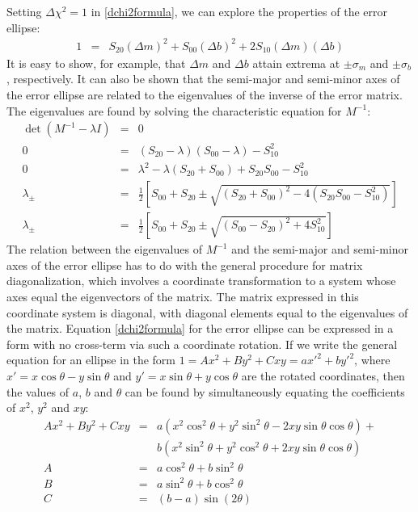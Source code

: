 \documentclass{article}
\begin{document}
Setting $\Delta \chi^2 = 1$ in \eqref{dchi2formula}, we can explore the properties of the error ellipse:
\begin{eqnarray}
  1 &=& S_{20} (\Delta m)^2 + S_{00} (\Delta b)^2 + 2S_{10} (\Delta m)(\Delta b) \label{errorellipse_1sig}
\end{eqnarray}
It is easy to show, for example, that $\Delta m$ and $\Delta b$ attain extrema at $\pm \sigma_m$ and $\pm \sigma_b$, respectively. It can also be shown that the semi-major and semi-minor axes of the error ellipse are related to the eigenvalues of the inverse of the error matrix. The eigenvalues are found by solving the characteristic equation for $M^{-1}$:
\begin{eqnarray}
  \det(M^{-1} - \lambda I) &=& 0 \\
  0 &=& (S_{20}-\lambda)(S_{00}-\lambda) - S_{10}^2 \\
  0 &=& \lambda^2 - \lambda(S_{20}+S_{00}) + S_{20}S_{00} - S_{10}^2 \\
  \lambda_{\pm} &=& \frac{1}{2}\left[S_{00}+S_{20} \pm \sqrt{(S_{20}+S_{00})^2-4(S_{20}S_{00}-S_{10}^2)}\right] \\
  \lambda_{\pm} &=& \frac{1}{2}\left[S_{00}+S_{20} \pm \sqrt{(S_{00}-S_{20})^2 + 4 S_{10}^2}\right]
\end{eqnarray}
The relation between the eigenvalues of $M^{-1}$ and the semi-major and semi-minor axes of the error ellipse has to do with the general procedure for matrix diagonalization, which involves a coordinate transformation to a system whose axes equal the eigenvectors of the matrix. The matrix expressed in this coordinate system is diagonal, with diagonal elements equal to the eigenvalues of the matrix. Equation \eqref{dchi2formula} for the error ellipse can be expressed in a form with no cross-term via such a coordinate rotation. If we write the general equation for an ellipse in the form $1 = A x^2 + B y^2 + Cxy = a {x'}^2 + b{y'^2}$, where $x' = x \cos \theta - y \sin \theta$ and $y' = x \sin \theta + y \cos \theta$ are the rotated coordinates, then the values of $a$, $b$ and $\theta$ can be found by simultaneously equating the coefficients of $x^2$, $y^2$ and $xy$:
\begin{eqnarray}
  A x^2 + By^2 + Cxy &=& a (x^2 \cos^2 \theta + y^2 \sin^2 \theta - 2xy \sin \theta \cos \theta) + \nonumber \\ 
  & & b(x^2 \sin^2 \theta + y^2 \cos^2 \theta + 2xy \sin \theta \cos \theta) \\
  A &=& a \cos^2 \theta + b \sin^2 \theta \\
  B &=& a \sin^2 \theta + b \cos^2 \theta \\
  C &=& (b - a) \sin(2\theta) 
\end{eqnarray}   
\end{document}
